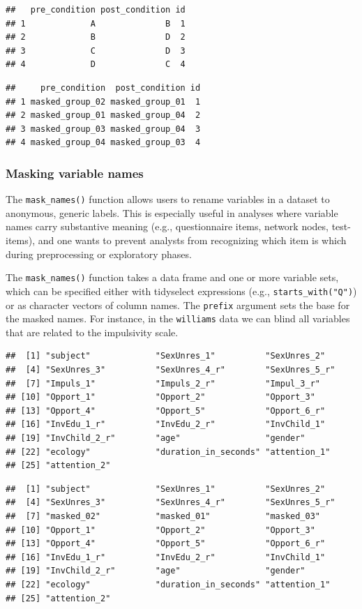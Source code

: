 \documentclass[
  english,
  man,floatsintext]{apa6}
\begin{document}
\begin{verbatim}
##   pre_condition post_condition id
## 1             A              B  1
## 2             B              D  2
## 3             C              D  3
## 4             D              C  4
\end{verbatim}

\begin{verbatim}
##     pre_condition  post_condition id
## 1 masked_group_02 masked_group_01  1
## 2 masked_group_01 masked_group_04  2
## 3 masked_group_03 masked_group_04  3
## 4 masked_group_04 masked_group_03  4
\end{verbatim}

\subsubsection{Masking variable names}\label{masking-variable-names}

The \texttt{mask\_names()} function allows users to rename variables in a dataset to anonymous, generic labels. This is especially useful in analyses where variable names carry substantive meaning (e.g., questionnaire items, network nodes, test-items), and one wants to prevent analysts from recognizing which item is which during preprocessing or exploratory phases.

The \texttt{mask\_names()} function takes a data frame and one or more variable sets, which can be specified either with tidyselect expressions (e.g., \texttt{starts\_with("Q")}) or as character vectors of column names. The \texttt{prefix} argument sets the base for the masked names. For instance, in the \texttt{williams} data we can blind all variables that are related to the impulsivity scale.

\begin{verbatim}
##  [1] "subject"             "SexUnres_1"          "SexUnres_2"         
##  [4] "SexUnres_3"          "SexUnres_4_r"        "SexUnres_5_r"       
##  [7] "Impuls_1"            "Impuls_2_r"          "Impul_3_r"          
## [10] "Opport_1"            "Opport_2"            "Opport_3"           
## [13] "Opport_4"            "Opport_5"            "Opport_6_r"         
## [16] "InvEdu_1_r"          "InvEdu_2_r"          "InvChild_1"         
## [19] "InvChild_2_r"        "age"                 "gender"             
## [22] "ecology"             "duration_in_seconds" "attention_1"        
## [25] "attention_2"
\end{verbatim}

\begin{verbatim}
##  [1] "subject"             "SexUnres_1"          "SexUnres_2"         
##  [4] "SexUnres_3"          "SexUnres_4_r"        "SexUnres_5_r"       
##  [7] "masked_02"           "masked_01"           "masked_03"          
## [10] "Opport_1"            "Opport_2"            "Opport_3"           
## [13] "Opport_4"            "Opport_5"            "Opport_6_r"         
## [16] "InvEdu_1_r"          "InvEdu_2_r"          "InvChild_1"         
## [19] "InvChild_2_r"        "age"                 "gender"             
## [22] "ecology"             "duration_in_seconds" "attention_1"        
## [25] "attention_2"
\end{verbatim}
\end{document}
